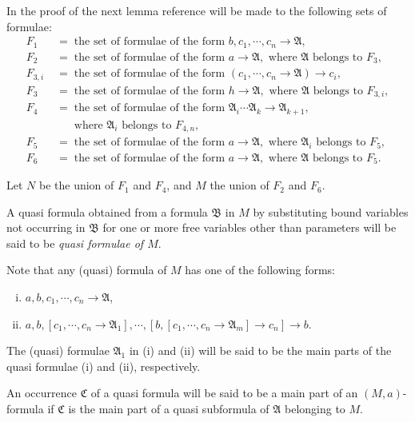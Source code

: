 \documentclass[12pt,a4paper]{article}
\begin{document}
In the proof of the next lemma reference will be made to the following sets of
formulae:
\begin{align*}
F_1 &\;=\;\text{the set of formulae of the form } b, c_1, \cdots, c_n \to \mathfrak{A},\\
F_2 &\;=\;\text{the set of formulae of the form } a \to \mathfrak{A}, \text{ where } \mathfrak{A} \text{ belongs to } F_3,\\
F_{3,i} &\;=\;\text{the set of formulae of the form } (c_1, \cdots, c_n \to \mathfrak{A}) \to c_i,\\
F_3  &\;=\;\text{the set of formulae of the form } h \to \mathfrak{A}, \text{ where } \mathfrak{A} \text{ belongs to } F_{3,i},\\
F_4  &\;=\;\text{the set of formulae of the form } \mathfrak{A}_i \cdots \mathfrak{A}_k \to \mathfrak{A}_{k+1}, \\
     &\phantom{\;=\;}\text{where } \mathfrak{A}_i \text{ belongs to } F_{4,n},\\
F_5  &\;=\;\text{the set of formulae of the form }
       a \to \mathfrak{A}, \text{ where } \mathfrak{A}_i \text{ belongs to } F_5,\\
F_6  &\;=\;\text{the set of formulae of the form } a \to \mathfrak{A}, \text{ where } \mathfrak{A} \text{ belongs to } F_5.
\end{align*}

Let $N$ be the union of $F_1$ and $F_4$, and $M$ the union of $F_2$ and $F_6$.

A quasi formula obtained from a formula $\mathfrak{B}$ in $M$ by substituting
bound variables not occurring in $\mathfrak{B}$ for one or more free variables
other than parameters will be said to be \emph{quasi formulae of $M$}.

Note that any (quasi) formula of $M$ has one of the following forms:
\begin{enumerate}[(i)]
\item $a, b, c_1, \cdots, c_n \to \mathfrak{A}$,
\item $a, b, [c_1, \cdots, c_n \to \mathfrak{A}_1], \cdots,
  [b, [c_1, \cdots, c_n \to \mathfrak{A}_m] \to c_n] \to b$.
\end{enumerate}
The (quasi) formulae $\mathfrak{A}_1$ in (i) and (ii) will be said to be
the main parts of the quasi formulae (i) and (ii), respectively.

An occurrence $\mathfrak{C}$ of a quasi formula will be said to be a main
part of an $(M, a)$-formula if $\mathfrak{C}$ is the main part of a quasi
subformula of $\mathfrak{A}$ belonging to $M$.
\end{document}
